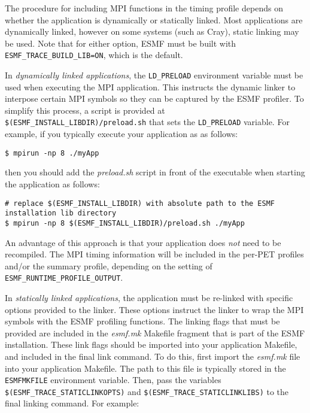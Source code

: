 The procedure for including MPI
functions in the timing profile depends on whether the application is
dynamically or statically linked. Most applications are dynamically linked,
however on some systems (such as Cray), static linking may be used.
Note that for either option, ESMF must be built with {\tt ESMF\_TRACE\_BUILD\_LIB=ON},
which is the default.

In {\em dynamically linked applications}, the {\tt LD\_PRELOAD} environment variable
must be used when executing the MPI application.  This instructs the dynamic
linker to interpose certain MPI symbols so they can be captured by the ESMF
profiler.  To simplify this process, a script is provided at
{\tt \$(ESMF\_INSTALL\_LIBDIR)/preload.sh} that sets the {\tt LD\_PRELOAD} variable.
For example, if you typically execute your application as as follows:

\begin{verbatim}
$ mpirun -np 8 ./myApp
\end{verbatim}

then you should add the {\em preload.sh} script in front of the
executable when starting the application as follows:

\begin{verbatim}
# replace $(ESMF_INSTALL_LIBDIR) with absolute path to the ESMF installation lib directory
$ mpirun -np 8 $(ESMF_INSTALL_LIBDIR)/preload.sh ./myApp
\end{verbatim}

An advantage of this approach is that your application does {\em not} need to
be recompiled. The MPI timing information will be included in the per-PET profiles and/or the summary
profile, depending on the setting of {\tt ESMF\_RUNTIME\_PROFILE\_OUTPUT}.

In {\em statically linked applications}, the application must be re-linked
with specific options provided to the linker.  These options instruct the linker
to wrap the MPI symbols with the ESMF profiling functions. The linking flags that
must be provided are included in the {\em esmf.mk} Makefile fragment that
is part of the ESMF installation. These link flags should be imported into
your application Makefile, and included in the final link command. To do this,
first import the {\em esmf.mk} file into your application Makefile. The path
to this file is typically stored in the {\tt ESMFMKFILE} environment variable.
Then, pass the variables {\tt \$(ESMF\_TRACE\_STATICLINKOPTS)} and
{\tt \$(ESMF\_TRACE\_STATICLINKLIBS)} to the final linking command.  For example:

